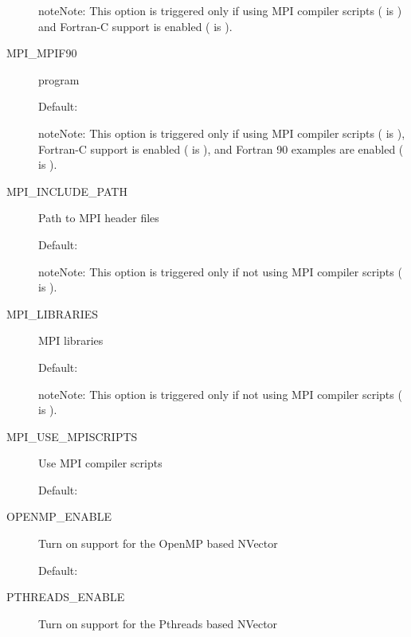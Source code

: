 \documentclass[letterpaper,10pt,english]{sphinxmanual}
\begin{document}
\begin{description}
\begin{notice}{note}{Note:}
This option is triggered only if using MPI compiler scripts
( is ) and Fortran-C support is enabled
( is ).
\end{notice}

\item[{\index{MPI\_MPIF90 (CMake option)}MPI\_MPIF90}] \leavevmode
{} program

Default:

\begin{notice}{note}{Note:}
This option is triggered only if using MPI compiler scripts
( is ), Fortran-C support is enabled
( is ), and Fortran 90 examples are enabled
( is ).
\end{notice}

\item[{\index{MPI\_INCLUDE\_PATH (CMake option)}MPI\_INCLUDE\_PATH}] \leavevmode
Path to MPI header files

Default: 

\begin{notice}{note}{Note:}
This option is triggered only if not using MPI compiler
scripts ( is ).
\end{notice}

\item[{\index{MPI\_LIBRARIES (CMake option)}MPI\_LIBRARIES}] \leavevmode
MPI libraries

Default: 

\begin{notice}{note}{Note:}
This option is triggered only if not using MPI compiler
scripts ( is ).
\end{notice}

\item[{\index{MPI\_USE\_MPISCRIPTS (CMake option)}MPI\_USE\_MPISCRIPTS}] \leavevmode
Use MPI compiler scripts

Default: 

\item[{\index{OPENMP\_ENABLE (CMake option)}OPENMP\_ENABLE}] \leavevmode
Turn on support for the OpenMP based NVector

Default: 

\item[{\index{PTHREADS\_ENABLE (CMake option)}PTHREADS\_ENABLE}] \leavevmode
Turn on support for the Pthreads based NVector


\end{description}
\end{document}
